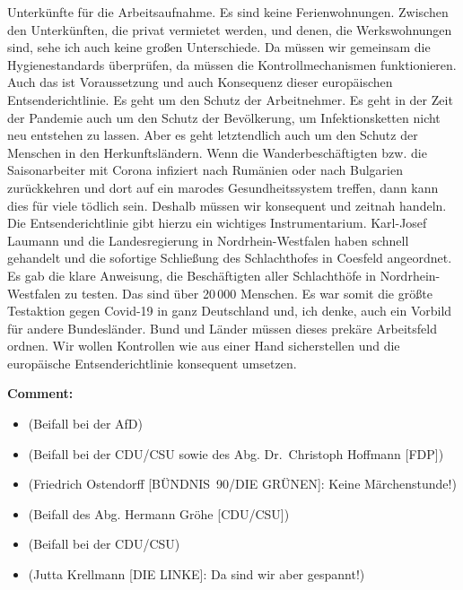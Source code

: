 \documentclass{article}
\begin{document}
Unterkünfte für die Arbeitsaufnahme. Es sind keine Ferienwohnungen. Zwischen den Unterkünften, die privat vermietet werden, und denen, die Werkswohnungen sind, sehe ich auch keine großen Unterschiede. Da müssen wir gemeinsam die Hygienestandards überprüfen, da müssen die Kontrollmechanismen funktionieren. Auch das ist Voraussetzung und auch Konsequenz dieser europäischen Entsenderichtlinie. Es geht um den Schutz der Arbeitnehmer. Es geht in der Zeit der Pandemie auch um den Schutz der Bevölkerung, um Infektionsketten nicht neu entstehen zu lassen. Aber es geht letztendlich auch um den Schutz der Menschen in den Herkunftsländern. Wenn die Wanderbeschäftigten bzw. die Saisonarbeiter mit Corona infiziert nach Rumänien oder nach Bulgarien zurückkehren und dort auf ein marodes Gesundheitssystem treffen, dann kann dies für viele tödlich sein. Deshalb müssen wir konsequent und zeitnah handeln. Die Entsenderichtlinie gibt hierzu ein wichtiges Instrumentarium. Karl-Josef Laumann und die Landesregierung in Nordrhein-Westfalen haben schnell gehandelt und die sofortige Schließung des Schlachthofes in Coesfeld angeordnet. Es gab die klare Anweisung, die Beschäftigten aller Schlachthöfe in Nordrhein-Westfalen zu testen. Das sind über 20 000 Menschen. Es war somit die größte Testaktion gegen Covid-19 in ganz Deutschland und, ich denke, auch ein Vorbild für andere Bundesländer. Bund und Länder müssen dieses prekäre Arbeitsfeld ordnen. Wir wollen Kontrollen wie aus einer Hand sicherstellen und die europäische Entsenderichtlinie konsequent umsetzen.  

\noindent\textbf{Comment:}
\begin{itemize}
    \setlength\itemsep{-3pt}
    \item (Beifall bei der AfD)
    \setlength\itemsep{-3pt}
    \item (Beifall bei der CDU/CSU sowie des Abg. Dr. Christoph Hoffmann [FDP])
    \setlength\itemsep{-3pt}
    \item (Friedrich Ostendorff [BÜNDNIS 90/DIE GRÜNEN]: Keine Märchenstunde!)
    \setlength\itemsep{-3pt}
    \item (Beifall des Abg. Hermann Gröhe [CDU/CSU])
    \setlength\itemsep{-3pt}
    \item (Beifall bei der CDU/CSU)
    \setlength\itemsep{-3pt}
    \item (Jutta Krellmann [DIE LINKE]: Da sind wir aber gespannt!)
\end{itemize}
\end{document}
